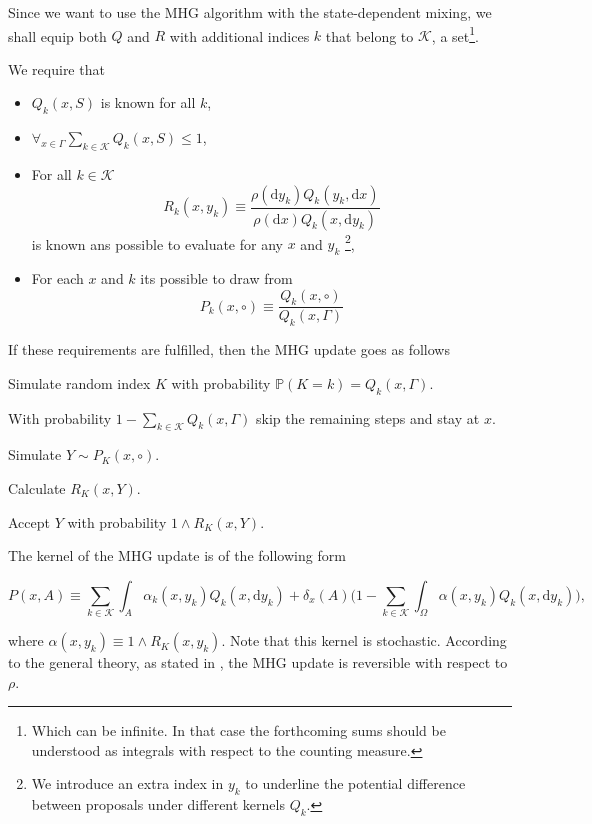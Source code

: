 Since we want to use the MHG algorithm with the state-dependent mixing, we shall equip both $Q$ and $R$ with additional indices $k$ that belong to $\mathcal{K}$, a set\footnote{Which can be infinite. In that case the forthcoming sums should be understood as integrals with respect to the counting measure.}.  

We require that

\begin{itemize}
	\item $Q_k (x,S)$ is known for all $k$,
	\item $\forall_{x \in \Gamma} \underset{ k \in \mathcal{K}}{\sum} Q_k (x,S) \leq 1$,
	\item For all $k \in \mathcal{K}$ $$R_k (x,y_k) \equiv \frac{\rho(\mathrm{d } y_k)Q_k (y_k, \mathrm{d }x)}{\rho(\mathrm{d } x)Q_k (x, \mathrm{d }y_k)}$$ is known ans possible to evaluate for any $x$ and $y_k$ \footnote{We introduce an extra index in $y_k$ to underline the potential difference between proposals under different kernels $Q_k$.},
	\item For each $x$ and $k$ its possible to draw from $$P_k(x, \circ) \equiv \frac{Q_k (x, \circ)}{Q_k (x, \Gamma)}$$
\end{itemize}

If these requirements are fulfilled, then the MHG update goes as follows

\begin{algorithm}
\item Simulate random index $K$ with probability $\mathbb{P}( K = k ) = Q_k (x,\Gamma)$.
\item[] With probability $1-\underset{k \in \mathcal{K}}{\sum} Q_k (x,\Gamma)$ skip the remaining steps and stay at $x$.
\item Simulate $Y \sim P_K (x, \circ)$.
\item Calculate $R_K (x,Y)$.
\item Accept $Y$ with probability $1\wedge R_K (x,Y)$.
\end{algorithm}

The kernel of the MHG update is of the following form

	$$P(x,A) \equiv \underset{k \in \mathcal{K}}{\sum} \int_A \alpha_k (x,y_k) Q_k(x, \mathrm{d }y_k) + \delta_x (A) \Big(1 - \underset{k \in \mathcal{K}}{\sum} \int_{\Omega} \alpha(x,y_k) Q_k(x,\mathrm{d }y_k) \Big), $$

where $\alpha(x,y_k) \equiv 1\wedge R_K (x,y_k)$. Note that this kernel is stochastic. According to the general theory, as stated in \cite{CharlesJ.Geyer}, the MHG update is reversible with respect to $\rho$. 



